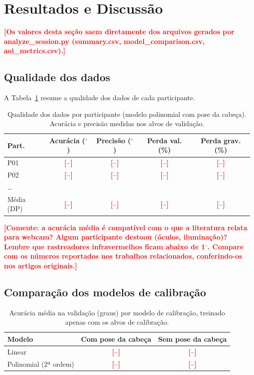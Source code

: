 \documentclass[sigconf, nonacm, language=english, language=portuguese, natbib=false]{acmart}
\newcommand{\pendente}[1]{\textcolor{red}{\textbf{[#1]}}}
\begin{document}
\section{Resultados e Discussão}\label{sec:resultados}

\pendente{Os valores desta seção saem diretamente dos arquivos gerados por analyze\_session.py (summary.csv, model\_comparison.csv, aoi\_metrics.csv).}

\subsection{Qualidade dos dados}

A Tabela~\ref{tab:qualidade} resume a qualidade dos dados de cada participante.

\begin{table}[t]
\caption{Qualidade dos dados por participante (modelo polinomial com pose da cabeça). Acurácia e precisão medidas nos alvos de validação.}
\label{tab:qualidade}
\begin{tabular}{lcccc}
\toprule
Part. & Acurácia ($^\circ$) & Precisão ($^\circ$) & Perda val. (\%) & Perda grav. (\%) \\
\midrule
P01 & \pendente{--} & \pendente{--} & \pendente{--} & \pendente{--} \\
P02 & \pendente{--} & \pendente{--} & \pendente{--} & \pendente{--} \\
\dots & & & & \\
\midrule
Média (DP) & \pendente{--} & \pendente{--} & \pendente{--} & \pendente{--} \\
\bottomrule
\end{tabular}
\end{table}

\pendente{Comente: a acurácia média é compatível com o que a literatura relata para webcam? Algum participante destoou (óculos, iluminação)? Lembre que rastreadores infravermelhos ficam abaixo de 1$^\circ$. Compare com os números reportados nos trabalhos relacionados, conferindo-os nos artigos originais.}

\subsection{Comparação dos modelos de calibração}

\begin{table}[t]
\caption{Acurácia média na validação (graus) por modelo de calibração, treinado apenas com os alvos de calibração.}
\label{tab:modelos}
\begin{tabular}{lcc}
\toprule
Modelo & Com pose da cabeça & Sem pose da cabeça \\
\midrule
Linear & \pendente{--} & \pendente{--} \\
Polinomial (2ª ordem) & \pendente{--} & \pendente{--} \\
\bottomrule
\end{tabular}
\end{table}
\end{document}
